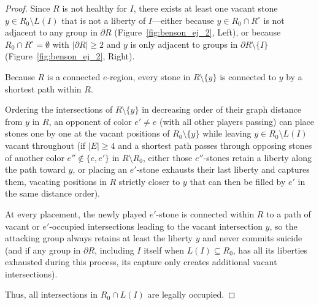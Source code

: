 \begin{proof}
	Since $R$ is not healthy for $I$, there exists at least one vacant stone $y \in R_0 \setminus L(I)$ that is not a liberty of $I$---either because $y \in R_0 \cap R^\circ$ is not adjacent to any group in $\partial R$ (Figure~\ref{fig:benson_ej_2}, Left), or because $R_0 \cap R^\circ = \emptyset$ with $|\partial R| \ge 2$ and $y$ is only adjacent to groups in $\partial R \setminus \{I\}$ (Figure~\ref{fig:benson_ej_2}, Right).
	
	Because $R$ is a connected $e$-region, every stone in $R \setminus \{y\}$ is connected to $y$ by a shortest path within $R$. 
	
	Ordering the intersections of $R \setminus \{y\}$ in decreasing order of their graph distance from $y$ in $R$, an opponent of color $e' \neq e$ (with all other players passing) can place stones one by one at the vacant positions of $R_0 \setminus \{y\}$ while leaving $y \in R_0 \setminus L(I)$ vacant throughout (if $|E| \ge 4$ and a shortest path passes through opposing stones of another color $e'' \notin \{e, e'\}$ in $R \setminus R_0$, either those $e''$-stones retain a liberty along the path toward $y$, or placing an $e'$-stone exhausts their last liberty and captures them, vacating positions in $R$ strictly closer to $y$ that can then be filled by $e'$ in the same distance order). 
	
	At every placement, the newly played $e'$-stone is connected within $R$ to a path of vacant or $e'$-occupied intersections leading to the vacant intersection $y$, so the attacking group always retains at least the liberty $y$ and never commits suicide (and if any group in $\partial R$, including $I$ itself when $L(I) \subseteq R_0$, has all its liberties exhausted during this process, its capture only creates additional vacant intersections). 
	
	Thus, all intersections in $R_0 \cap L(I)$ are legally occupied.
\end{proof}

